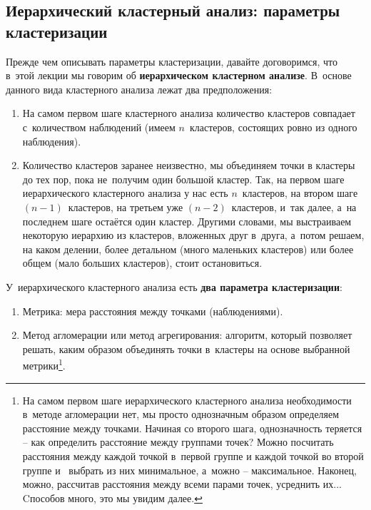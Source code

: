 \documentclass[12pt,a4paper]{article}
\theoremstyle{definition}
\begin{document}
\subsection{Иерархический кластерный анализ: параметры кластеризации}

Прежде чем описывать параметры кластеризации, давайте договоримся, что в~этой лекции 
мы говорим об \textbf{иерархическом кластерном анализе}. В~основе данного вида кластерного 
анализа лежат два предположения:

\begin{enumerate}
\item На самом первом шаге кластерного анализа количество кластеров совпадает 
с~количеством наблюдений (имеем $n$~кластеров, состоящих ровно из одного наблюдения).
\item Количество кластеров заранее неизвестно, мы объединяем точки в кластеры до тех пор, 
пока не~получим один большой кластер. Так, на первом шаге иерархического кластерного 
анализа у нас есть $n$~кластеров, на втором шаге $(n-1)$~кластеров, на третьем уже 
$(n-2)$~кластеров, и~так далее, а~на последнем шаге остаётся один кластер. Другими словами, 
мы выстраиваем некоторую иерархию из кластеров, вложенных друг в~друга, а~потом решаем, 
на каком делении, более детальном (много маленьких кластеров) или более общем 
(мало больших кластеров), 
стоит остановиться. 
\end{enumerate}

У~иерархического кластерного анализа есть \textbf{два параметра кластеризации}:

\begin{enumerate}
\item Метрика: мера расстояния между точками (наблюдениями).
\item Метод агломерации или метод агрегирования: алгоритм, который позволяет решать, 
каким образом объединять точки в~кластеры на основе выбранной метрики\footnote{На самом 
первом шаге иерархического кластерного анализа необходимости в~методе агломерации нет, 
мы просто однозначным образом определяем расстояние между точками. Начиная со второго шага, 
однозначность теряется – как определить расстояние между группами точек? Можно посчитать 
расстояния между каждой точкой в~первой группе и каждой точкой во второй группе и~
выбрать из них минимальное, а~можно – максимальное. Наконец, можно, рассчитав расстояния 
между всеми парами точек, усреднить их... Cпособов много, это мы увидим далее.}.
\end{enumerate}
\end{document}
